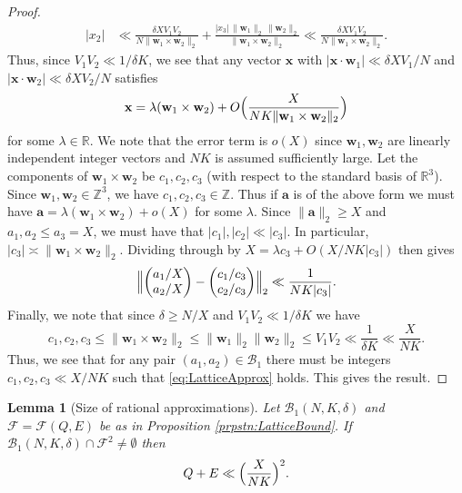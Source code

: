 \documentclass[10pt]{amsart}
\theoremstyle{plain}
\newtheorem{lmm}[thrm]{Lemma}
\numberwithin{sblmm}{thrm}
\numberwithin{equation}{section}
\begin{document}
\begin{proof}
\begin{align*}
|x_2|&\ll \frac{\delta X V_1 V_2}{N \|\mathbf{w}_1\times \mathbf{w}_2\|_2}+\frac{|x_3|\, \|\mathbf{w}_1\|_2 \, \|\mathbf{w}_2\|_2}{\|\mathbf{w}_1\times \mathbf{w}_2\|_2}\ll \frac{\delta X V_1 V_2}{N \|\mathbf{w}_1\times \mathbf{w}_2\|_2}.
\end{align*}
Thus, since $V_1V_2\ll 1/\delta K$, we see that any vector $\mathbf{x}$ with $|\mathbf{x}\cdot \mathbf{w}_1|\ll \delta X V_1/N$ and $|\mathbf{x}\cdot \mathbf{w}_2|\ll \delta X V_2/N$ satisfies 
\[
\mathbf{x}=\lambda (\mathbf{w}_1\times\mathbf{w}_2)+O\Bigl(\frac{X}{N K \|\mathbf{w}_1\times\mathbf{w}_2\|_2}\Bigr)
\]
for some $\lambda\in \mathbb{R}$. We note that the error term is $o(X)$ since $\mathbf{w}_1,\mathbf{w}_2$ are linearly independent integer vectors and $N K$ is assumed sufficiently large.  Let the components of $\mathbf{w}_1\times \mathbf{w}_2$ be $c_1,c_2,c_3$ (with respect to the standard basis of $\mathbb{R}^3$). Since $\mathbf{w}_1,\mathbf{w}_2\in\mathbb{Z}^3$, we have $c_1,c_2,c_3\in\mathbb{Z}$. Thus if $\mathbf{a}$ is of the above form we must have $\mathbf{a}=\lambda(\mathbf{w}_1\times \mathbf{w}_2)+o(X)$ for some $\lambda$. Since $\|\mathbf{a}\|_2\ge X$ and $a_1,a_2\le a_3=X$, we must have that $|c_1|,|c_2|\ll |c_3|$. In particular, $|c_3|\asymp \|\mathbf{w}_1\times\mathbf{w}_2\|_2$. Dividing through by $X=\lambda c_3+O(X/N K |c_3|)$ then gives
\begin{equation}
\Bigl\|
\begin{pmatrix}
a_1/X\\
a_2/X
\end{pmatrix}
-
\begin{pmatrix}
c_1/c_3\\
c_2/c_3
\end{pmatrix}
\Bigr\|_2\ll \frac{1}{N K |c_3|}.\label{eq:LatticeApprox}
\end{equation}
Finally, we note that since $\delta \ge N/X$ and $V_1 V_2\ll 1/\delta K$ we have
\[
c_1,c_2,c_3\le \|\mathbf{w}_1\times\mathbf{w}_2\|_2\le \|\mathbf{w}_1\|_2\|\mathbf{w}_2\|_2\le V_1 V_2 \ll \frac{1}{\delta K} \ll \frac{X}{NK}.
\]
Thus, we see that for any pair $(a_1,a_2)\in\mathcal{B}_1$ there must be integers $c_1,c_2,c_3\ll X/N K$ such that \eqref{eq:LatticeApprox} holds. This gives the result.
\end{proof}
%
%
%
%
\begin{lmm}[Size of rational approximations]\label{lmm:RatSize}
Let  $\mathcal{B}_1(N,K,\delta)$ and $\mathcal{F}=\mathcal{F}(Q,E)$ be as in Proposition \ref{prpstn:LatticeBound}. If $\mathcal{B}_1(N,K,\delta)\cap\mathcal{F}^2\ne\emptyset$ then
\[
Q+E\ll \Bigl(\frac{X}{N K}\Bigr)^2.
\]
\end{lmm}
\end{document}
